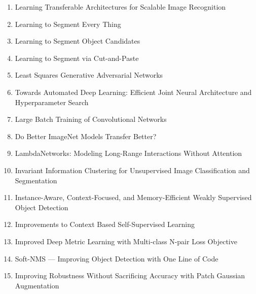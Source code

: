 \documentclass[acmlarge]{acmart}
\begin{document}
\begin{enumerate}
	\item Learning Transferable Architectures for Scalable Image Recognition \cite{Zoph2018LearningTA} 

	\item Learning to Segment Every Thing \cite{Hu2018LearningTS} 

	\item Learning to Segment Object Candidates \cite{Pinheiro2015LearningTS} 

	\item Learning to Segment via Cut-and-Paste \cite{Remez2018LearningTS} 

	\item Least Squares Generative Adversarial Networks \cite{Mao2017LeastSG} 

	\item Towards Automated Deep Learning: Efficient Joint Neural Architecture and Hyperparameter Search \cite{Zela2018TowardsAD} 

	\item Large Batch Training of Convolutional Networks \cite{You2017LargeBT} 

	\item Do Better ImageNet Models Transfer Better? \cite{Kornblith2019DoBI} 

	\item LambdaNetworks: Modeling Long-Range Interactions Without Attention \cite{Bello2021LambdaNetworksML} 

	\item Invariant Information Clustering for Unsupervised Image Classification and Segmentation \cite{Ji2019InvariantIC} 

	\item Instance-Aware, Context-Focused, and Memory-Efficient Weakly Supervised Object Detection \cite{Ren2020InstanceAwareCA} 

	\item Improvements to Context Based Self-Supervised Learning \cite{Mundhenk2018ImprovementsTC} 

	\item Improved Deep Metric Learning with Multi-class N-pair Loss Objective \cite{Sohn2016ImprovedDM} 

	\item Soft-NMS — Improving Object Detection with One Line of Code \cite{Bodla2017SoftNMSI} 

	\item Improving Robustness Without Sacrificing Accuracy with Patch Gaussian Augmentation \cite{Lopes2019ImprovingRW} 


\end{enumerate}
\end{document}

